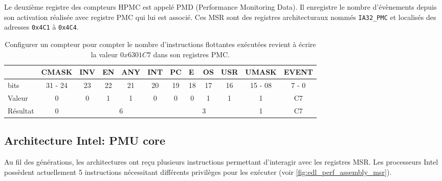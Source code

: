         
        Le deuxième registre des compteurs HPMC est appelé PMD (Performance Monitoring Data). Il enregistre le nombre d'évènements depuis son activation réalisée avec registre PMC qui lui est associé. Ces MSR sont des registres architecturaux nommés \verb|IA32_PMC| et localisés des adresses \verb|0x4C1| à \verb|0x4C4|.
       
        
        \begin{table}[]
        \centering
        \begin{tabular}{l|c|c|c|c|c|c|c|c|c|c|c|}
        \cline{2-12}
        & \multicolumn{1}{l|}{CMASK} & \multicolumn{1}{l|}{INV} & \multicolumn{1}{l|}{EN} & \multicolumn{1}{l|}{ANY} & \multicolumn{1}{l|}{INT} & \multicolumn{1}{l|}{PC} & \multicolumn{1}{l|}{E} & \multicolumn{1}{l|}{OS} & \multicolumn{1}{l|}{USR} & \multicolumn{1}{l|}{UMASK} & \multicolumn{1}{l|}{EVENT} \\ \hline
        \multicolumn{1}{|l|}{bits} & 31 - 24 & 23 & 22 & 21 & 20 & 19 & 18 & 17 & 16 & 15 - 08 & 7 - 0 \\ \hline
        \multicolumn{1}{|l|}{Valeur} & 0 & 0 & 1 & 1 & 0 & 0 & 0 & 1 & 1 & 1 & C7 \\ \hline
        \multicolumn{1}{|l|}{Résultat} & 0 & \multicolumn{4}{c|}{6} & \multicolumn{4}{c|}{3} & 1 & C7 \\ \hline
        \end{tabular}%
        \caption{Configurer un compteur pour compter le nombre d'instructions flottantes exécutées revient à écrire la valeur $0x6301C7$ dans son registres PMC.}
        \label{tab:pmc_config}
        \end{table}
        
  

        
        
    \subsection{Architecture Intel: PMU core} \label{sec:perf_asm_msr}
    
        Au fil des générations, les architectures ont reçu plusieurs instructions permettant d'interagir avec les registres MSR. Les processeurs Intel possèdent actuellement 5 instructions nécessitant différents privilèges pour les exécuter (voir \autoref{fig:edl_perf_assembly_msr}).
        
